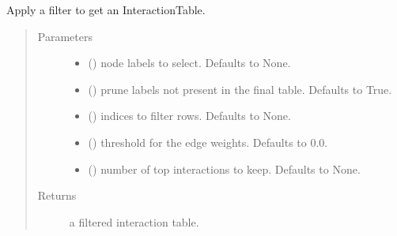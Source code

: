 \documentclass[letterpaper,10pt,english]{sphinxmanual}
\begin{document}
\begin{fulllineitems}
\begin{fulllineitems}
\label{\detokenize{_modules/cosifer.collections:cosifer.collections.interaction_table.InteractionTable.apply_filter}}
Apply a filter to get an InteractionTable.
\begin{quote}\begin{description}
\item[{Parameters}] \leavevmode\begin{itemize}
\item {} 
 (\sphinxstyleliteralemphasis{\sphinxupquote{, }}) \textendash{} node labels to select.
Defaults to None.

\item {} 
 (\sphinxstyleliteralemphasis{\sphinxupquote{, }}) \textendash{} prune labels not present in the
final table. Defaults to True.

\item {} 
 (\sphinxstyleliteralemphasis{\sphinxupquote{, }}) \textendash{} indices to filter rows.
Defaults to None.

\item {} 
 (\sphinxstyleliteralemphasis{\sphinxupquote{, }}) \textendash{} threshold for the edge weights.
Defaults to 0.0.

\item {} 
 (\sphinxstyleliteralemphasis{\sphinxupquote{, }}) \textendash{} number of top interactions to keep.
Defaults to None.

\end{itemize}

\item[{Returns}] \leavevmode
a filtered interaction table.


\end{description}
\end{quote}
\end{fulllineitems}
\end{fulllineitems}
\end{document}

